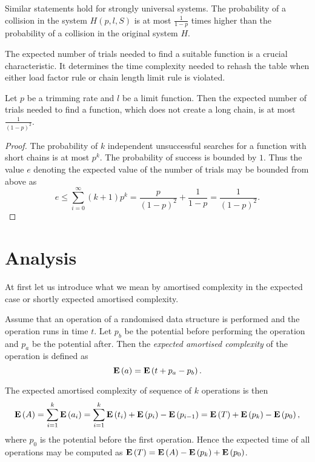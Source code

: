 Similar statements hold for strongly universal systems. The probability of a collision in the system $H(p, l, S)$ is at most $\frac{1}{1 - p}$ times higher than the probability of a collision in the original system $H$.

The expected number of trials needed to find a suitable function is a crucial characteristic. It determines the time complexity needed to rehash the table when either load factor rule or chain length limit rule is violated. 

\begin{lemma}
\label{lemma-linear-transformations-trials}
Let $p$ be a trimming rate and $l$ be a limit function. Then the expected number of trials needed to find a function, which does not create a long chain, is at most $\frac{1}{(1 - p) ^ 2}$.
\end{lemma}
\begin{proof}
The probability of $k$ independent unsuccessful searches for a function with short chains is at most $p ^ k$. The probability of success is bounded by $1$. Thus the value $e$ denoting the expected value of the number of trials may be bounded from above as
\[
e \leq \sum_{i = 0}^{\infty} (k + 1)p^k = \frac{p}{(1 - p) ^ 2} + \frac{1}{1 - p} = \frac{1}{(1 - p) ^ 2} \text{.}
\]
\end{proof}

\section{Analysis}

At first let us introduce what we mean by amortised complexity in the expected case or shortly expected amortised complexity.

\begin{definition}
Assume that an operation of a randomised data structure is performed and the operation runs in time $t$. Let $p_b$ be the potential before performing the operation and $p_a$ be the potential after. Then the \emph{expected amortised complexity} of the operation is defined as \[ \mathbf{E}\left(a\right) = \mathbf{E}\left(t + p_a - p_{b}\right) \text{.} \]
\end{definition}

The expected amortised complexity of sequence of $k$ operations is then
\[
\mathbf{E}\left(A\right) = \sum_{i=1}^{k} \mathbf{E}\left(a_i\right) = \sum_{i = 1}^{k} \mathbf{E}\left(t_i\right) + \mathbf{E}\left(p_i\right) - \mathbf{E}\left(p_{i - 1}\right) = \mathbf{E}\left(T\right) + \mathbf{E}\left(p_k\right) - \mathbf{E}\left(p_0\right),
\]
where $p_0$ is the potential before the first operation. Hence the expected time of all operations may be computed as $\mathbf{E}\left(T\right) = \mathbf{E}\left(A\right) - \mathbf{E}\left(p_k\right) + \mathbf{E}\left(p_0\right)$.

